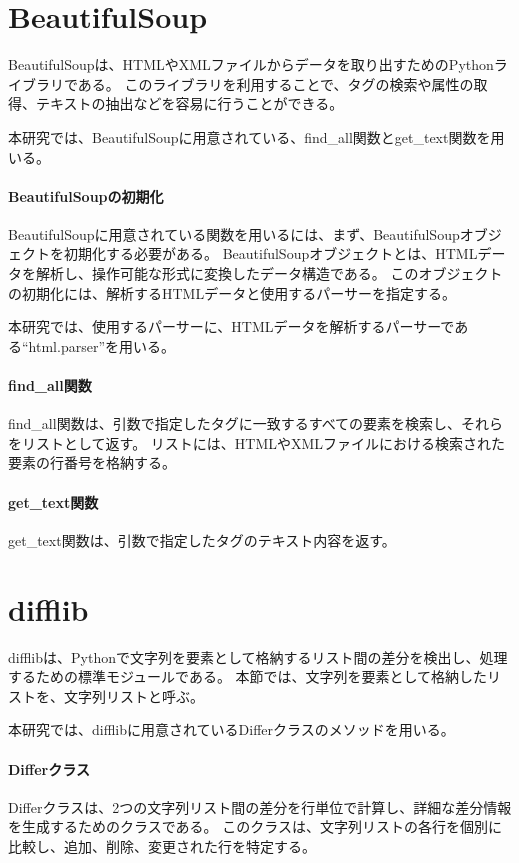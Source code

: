 \section{BeautifulSoup}\label{sec:beautifulsoup}
BeautifulSoup\cite{BeautifulSoup}は、HTMLやXMLファイルからデータを取り出すためのPythonライブラリである。
このライブラリを利用することで、タグの検索や属性の取得、テキストの抽出などを容易に行うことができる。
\par
本研究では、BeautifulSoupに用意されている、find\_all関数とget\_text関数を用いる。
\paragraph{BeautifulSoupの初期化}
BeautifulSoupに用意されている関数を用いるには、まず、BeautifulSoupオブジェクトを初期化する必要がある。
BeautifulSoupオブジェクトとは、HTMLデータを解析し、操作可能な形式に変換したデータ構造である。
このオブジェクトの初期化には、解析するHTMLデータと使用するパーサーを指定する。
\par
本研究では、使用するパーサーに、HTMLデータを解析するパーサーである“html.parser”\cite{BeautifulSoup}を用いる。
\paragraph{find\_all関数}
find\_all関数は、引数で指定したタグに一致するすべての要素を検索し、それらをリストとして返す。
リストには、HTMLやXMLファイルにおける検索された要素の行番号を格納する。
\paragraph{get\_text関数}
get\_text関数は、引数で指定したタグのテキスト内容を返す。

\section{difflib}\label{sec:difflib}
difflib\cite{difflib}は、Pythonで文字列を要素として格納するリスト間の差分を検出し、処理するための標準モジュールである。
本節では、文字列を要素として格納したリストを、文字列リストと呼ぶ。
\par
本研究では、difflibに用意されているDifferクラスのメソッドを用いる。
\paragraph{Differクラス}
Differクラスは、2つの文字列リスト間の差分を行単位で計算し、詳細な差分情報を生成するためのクラスである。
このクラスは、文字列リストの各行を個別に比較し、追加、削除、変更された行を特定する。
